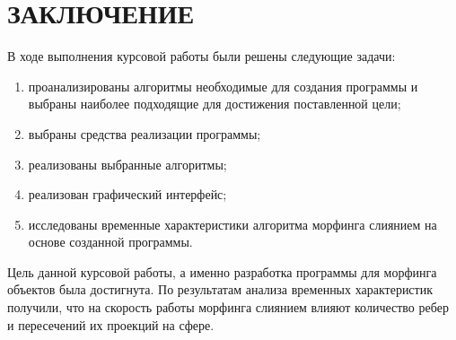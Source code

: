 \chapter*{ЗАКЛЮЧЕНИЕ}

В ходе выполнения курсовой работы были решены следующие задачи:

\begin{enumerate}[label={\arabic*)}]
\item проанализированы алгоритмы необходимые для создания программы и выбраны наиболее подходящие для достижения поставленной цели;
\item выбраны средства реализации программы;
\item реализованы выбранные алгоритмы;
\item реализован графический интерфейс;
\item исследованы временные характеристики алгоритма морфинга слиянием на основе созданной программы.
\end{enumerate}

Цель данной курсовой работы, а именно разработка программы для морфинга объектов была достигнута. По результатам анализа временных характеристик получили, что на скорость работы морфинга слиянием влияют количество ребер и пересечений их проекций на сфере.